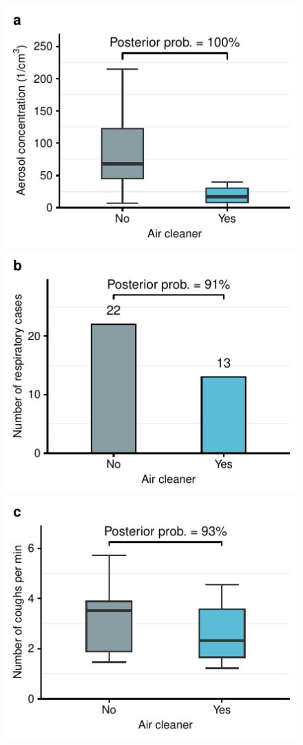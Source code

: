 \documentclass[fleqn,11pt]{wlscirep}
\begin{document}
\clearpage

\begin{figure}[!htpb]
\centering
    \includegraphics{../../results/env-data/aerosol-number-boxplot.pdf}\hspace{.5cm}
    \includegraphics{../../results/epi-data/cases_by_condition.pdf}
    \includegraphics{../../results/cough-data/coughs-frequency-by-condition.pdf}\hspace{.5cm}

\end{figure}
\end{document}
